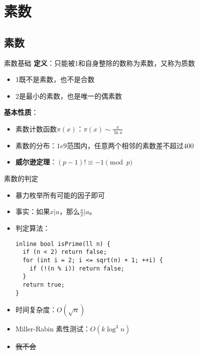 \section{素数}
\subsection{素数}
\begin{frame}{素数基础}
  \textbf{定义}：只能被1和自身整除的数称为素数，又称为质数
  \begin{itemize}
    \item 1既不是素数，也不是合数
    \item 2是最小的素数，也是唯一的偶素数
  \end{itemize}
  \vspace{0.5cm}
  \pause 
  \textbf{基本性质}：
  \begin{itemize}
    \item 素数计数函数$\pi(x)$：$\pi(x)\sim \frac{x}{\ln{x}}$
    \pause
    \item 素数的分布：$1e9$范围内，任意两个相邻的素数差不超过$400$
    \pause
    \item \textbf{威尔逊定理}：$(p-1)!\equiv -1\pmod{p}$
  \end{itemize}
\end{frame}

\begin{frame}[fragile]{素数的判定}
  \begin{itemize}
    \item 暴力枚举所有可能的因子即可
    \item 事实：如果$x|a$，那么$\frac{a}{x}|a$。
    \item 判定算法：
\begin{lstlisting}
inline bool isPrime(ll n) {
  if (n < 2) return false;
  for (int i = 2; i <= sqrt(n) + 1; ++i) {
    if (!(n % i)) return false;
  }
  return true;
}
\end{lstlisting}
  \item 时间复杂度：$O(\sqrt{n})$
  \pause
  \item Miller-Rabin 素性测试：$O(k\log^3{n})$
  \item \sout{我不会}
  \end{itemize}
\end{frame}



